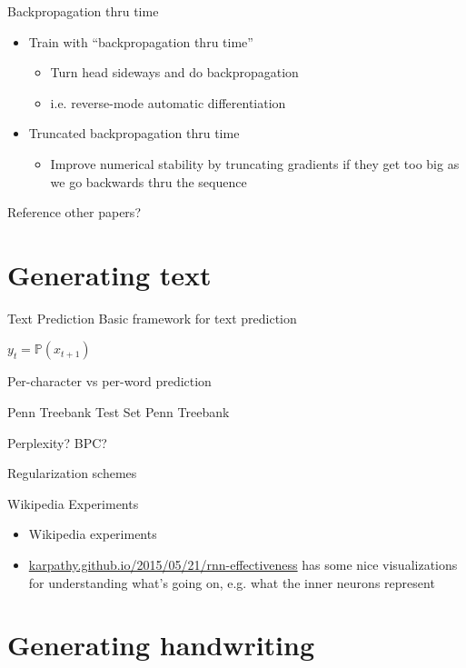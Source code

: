 \documentclass[xcolor=dvipsnames]{beamer}
\def\bbP{\mathbb{P}}
\begin{document}
\begin{frame}{Backpropagation thru time}
  \begin{itemize}
  \item Train with ``backpropagation thru time''
    \begin{itemize}
    \item Turn head sideways and do backpropagation
    \item i.e. reverse-mode automatic differentiation
    \end{itemize}
  \item Truncated backpropagation thru time
    \begin{itemize}
    \item Improve numerical stability by truncating gradients if they get too
      big as we go backwards thru the sequence
    \end{itemize}
  \end{itemize}
  Reference other papers?
\end{frame}

\section{Generating text}

\begin{frame}{Text Prediction}
  Basic framework for text prediction

  $y_t = \bbP(x_{t+1})$
  
  Per-character vs per-word prediction
\end{frame}

\begin{frame}{Penn Treebank Test Set}
  Penn Treebank
  
  Perplexity? BPC?

  Regularization schemes
\end{frame}

\begin{frame}{Wikipedia Experiments}
  \begin{itemize}
  \item   Wikipedia experiments
  \item \url{karpathy.github.io/2015/05/21/rnn-effectiveness} has some nice
    visualizations for understanding what's going on, e.g. what the inner
    neurons represent
  \end{itemize}
\end{frame}

\section{Generating handwriting}
\end{document}
